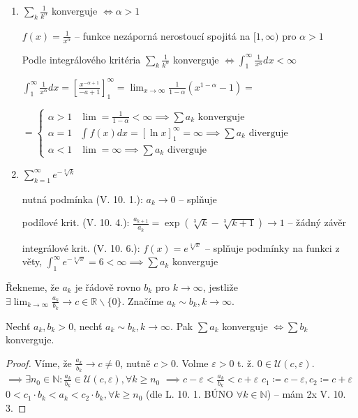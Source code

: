 \begin{priklad}
  \begin{enumerate}[1)]
    \item $\sum_k \frac{1}{k^\alpha}$ konverguje $\iff \alpha >1$

    $f(x) = \frac{1}{x^\alpha}$ -- funkce nezáporná nerostoucí spojitá na $[1, \infty)$ pro $\alpha >1$

    Podle integrálového kritéria $\sum_k \frac{1}{k^\alpha}$ konverguje $\iff \int_1^\infty \frac{1}{x^\alpha} dx <\infty$

    $\int_1^\infty \frac{1}{x^\alpha} dx = [\frac{x^{-\alpha+1}}{-a+1}]_1^\infty = \lim_{x\to \infty} \frac{1}{1-\alpha} (x^{1-\alpha}-1)=$

    $=\begin{cases}
      \alpha >1 & \lim = \frac{1}{1-\alpha}<\infty \implies \sum a_k\text{ konverguje}\\
      \alpha = 1  & \int f(x)dx = [\ln x]_1^\infty = \infty \implies \sum a_k \text{ diverguje}\\
      \alpha <1 & \lim = \infty \implies \sum a_k \text{ diverguje}
    \end{cases}$
    \item $\sum_{k=1}^\infty e^{-\sqrt[3]{k}}$

    nutná podmínka (V. 10. 1.): $a_k \to 0$ -- splňuje

    podílové krit. (V. 10. 4.): $\frac{a_{k+1}}{a_k} = \exp(\sqrt[3]{k}-\sqrt[3]{k+1}) \to 1$ -- žádný závěr

    integrálové krit. (V. 10. 6.): $f(x) = e^{\sqrt[3]{x}}$ -- splňuje podmínky na funkci z věty, $\int_1^\infty e^{-\sqrt[3]{x}} = 6 <\infty \implies \sum a_k$ konverguje
  \end{enumerate}
\end{priklad}

\begin{definice}
  Řekneme, že $a_k$ je řádově rovno $b_k$ pro $k \to \infty$, jestliže $\exists \lim_{k\to \infty} \frac{a_k}{b_k} \to c \in \mathbb R \smallsetminus \{0\}$. Značíme $a_k \sim b_k, k \to \infty$.
\end{definice}

\begin{veta}
  Nechť $a_k, b_k >0$, nechť $a_k \sim b_k, k \to \infty$. Pak $\sum a_k$ konverguje $\iff \sum b_k$ konverguje.
\end{veta}

\begin{proof}
  Víme, že $\frac{a_k}{b_k} \to c \neq 0$, nutně $c >0$.
  Volme $\varepsilon >0$ t. ž. $0 \in \mathscr U(c, \varepsilon)$.
  $\implies \exists n_0 \in \mathbb N: \frac{a_k}{b_k} \in \mathscr U(c, \varepsilon), \forall k \geq n_0$
  $\implies c- \varepsilon < \frac{a_k}{b_k} < c + \varepsilon$
  $c_1 \coloneq c - \varepsilon, c_2 \coloneq c+\varepsilon$
  $0 < c_1 \cdot b_k < a_k < c_2 \cdot b_k, \forall k \geq n_0$ (dle L. 10. 1. BÚNO $\forall k \in \mathbb N$) -- mám 2x V. 10. 3.
\end{proof}

